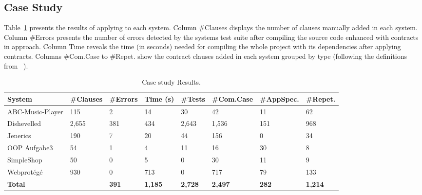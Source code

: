 \subsection{Case Study}

Table~\ref{tab:caseStudyResults} presents the results of applying \contractjdoc{} to each system.
Column \#Clauses displays the number of clauses manually added in each system.
Column \#Errors presents the number of errors detected by the systems test suite after compiling the source code enhanced with contracts in
\contractjdoc{} approach. Column Time reveals the time (in seconds) needed for compiling the whole
project with its dependencies after applying \contractjdoc{} contracts. Columns \#Com.Case to \#Repet.
show the contract clauses added in each system grouped by type (following the
definitions from ~\cite{typeContracts}).

\begin{table}[h]
\caption{Case study Results.}
\label{tab:caseStudyResults}
\centering
\begin{tabular}{l l l l l l l l}
\hline
 \bfseries System &
 \bfseries \#Clauses & 
 \bfseries \#Errors & 
 \bfseries Time (s) &
 \bfseries \#Tests &
 \bfseries \#Com.Case &
 \bfseries \#AppSpec. &
 \bfseries \#Repet. \\ \hline
ABC-Music-Player & 115 & 2 & 14 & 30 & 42 & 11 & 62 \\
Dishevelled & 2,655 & 381 & 434 & 2,643 & 1,536 & 151 & 968 \\
Jenerics & 190 & 7 & 20 & 44 & 156 & 0 & 34 \\
OOP Aufgabe3 & 54 & 1 & 4 & 11 & 16 & 30 & 8 \\
SimpleShop & 50 & 0 & 5 & 0 & 30 & 11 & 9 \\
Webprot\'{e}g\'{e} & 930 & 0 & 713 & 0 & 717 & 79 & 133 \\ \hline

 \bfseries Total & 
 \bfseries \totalClauses{} & 
 \bfseries 391 &
 \bfseries 1,185 &
 \bfseries 2,728 &
 \bfseries 2,497 &
 \bfseries 282 &
 \bfseries 1,214
\\
\bottomrule
\end{tabular}
\end{table}


